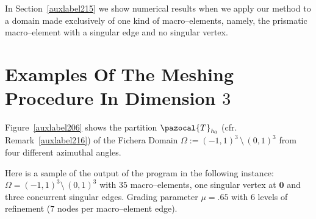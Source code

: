 In Section~\ref{auxlabel215} we show numerical results when we
apply our method to a domain made exclusively of one kind of macro--elements,
namely, the prismatic macro--element with a singular edge and no singular vertex.

\section{Examples Of The Meshing Procedure In Dimension $3$} %
\label{auxlabel214}
Figure~\ref{auxlabel206} shows the partition $\pazocal{T}_{\textit{h}_0}$ (cfr. Remark~\ref{auxlabel216}) of the Fichera Domain 
$\Omega:=(-1,1)^3\,\setminus\,(0,1)^3$ from four different azimuthal 
angles. 

\tauZero 

\newpage
Here is a sample of the output of the program in the following instance:
$\Omega = (-1,1)^3\setminus\,(0,1)^3$ with $35$ macro--elements, one singular
vertex at $\boldsymbol{0}$ and three concurrent singular edges. Grading parameter
$\mu = .65$ with $6$ levels of refinement ($7$ nodes per macro--element edge).

